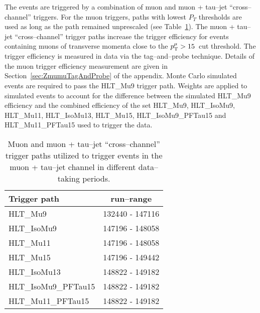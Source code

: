 The events are triggered by a combination of muon and muon + tau--jet
``cross--channel'' triggers. For the muon triggers, paths with lowest $P_{T}$
thresholds are used as long as the path remained unprescaled (see
Table~\ref{tab:AHtoMuTauTriggers}). 
The muon + tau--jet ``cross--channel'' trigger paths increase the trigger efficiency for
events containing muons of transverse momenta close to the
$p_{\mathrm{T}}^{\mu} > 15$~\GeVc cut threshold.
The trigger efficiency is measured in data via the tag--and--probe
technique. Details of the muon trigger efficiency measurement are
given in Section~\ref{sec:ZmumuTagAndProbe} of the appendix.
Monte Carlo simulated events are required to pass the
HLT\_Mu9 trigger path. Weights are applied to simulated events to account for the
difference between the simulated HLT\_Mu9 efficiency and the combined
efficiency of the set HLT\_Mu9, HLT\_IsoMu9, HLT\_Mu11, HLT\_IsoMu13,
HLT\_Mu15, HLT\_IsoMu9\_PFTau15 and HLT\_Mu11\_PFTau15 used to trigger
the data.

\begin{table}[t]
\begin{center}

\begin{tabular}{|l|c|}
\hline
Trigger path & run--range \\
\hline
HLT\_Mu9             & 132440 - 147116 \\
HLT\_IsoMu9          & 147196 - 148058 \\
HLT\_Mu11            & 147196 - 148058 \\
HLT\_Mu15            & 147196 - 149442 \\
HLT\_IsoMu13         & 148822 - 149182 \\
HLT\_IsoMu9\_PFTau15 & 148822 - 149182 \\
HLT\_Mu11\_PFTau15   & 148822 - 149182 \\
\hline
\end{tabular}
\end{center}
\begin{center}
\caption[High Level Triggers used to select $\mu + \tau_h$ events]{\captiontext
Muon and muon + tau--jet ``cross--channel'' trigger paths utilized to trigger
events in the muon + tau--jet channel in different data--taking periods.}
\label{tab:AHtoMuTauTriggers}
\end{center}
\end{table}

\ifx\master\undefined\fi
